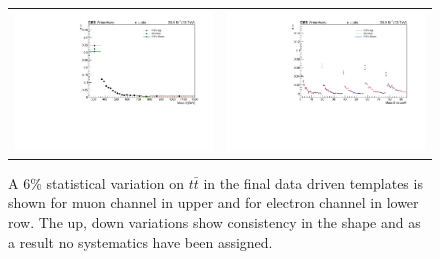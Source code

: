 \begin{figure}[htp]
\begin{tabular}{cc}
 \hspace{-0.5cm} \includegraphics[scale=0.4]{fig/chapt6/qcd/qcd_e_ch/ttbar_m_ttsys_6perUpDn.pdf}
& \hspace{-0.95cm} \includegraphics[scale=0.4]{fig/chapt6/qcd/qcd_e_ch/ttbar_m_cosine_ttsys_6perUpDn.pdf}\\

\end{tabular}
\caption{A 6\% statistical variation on $t\bar{t}$ in the final data driven templates is shown for muon channel in upper and for electron channel in lower row. The up, down variations show consistency in the shape and as a result no systematics have been assigned. }\label{Fig:data_driven_qcd_sys}
\end{figure}

